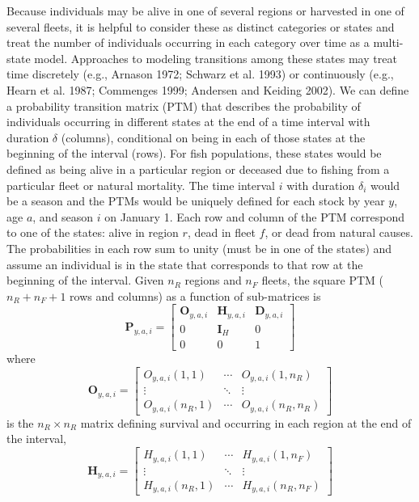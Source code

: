 \documentclass[
]{article}
\begin{document}
Because individuals may be alive in one of several regions or harvested in one of several fleets, it is helpful to consider these as distinct categories or states and treat the number of individuals occurring in each category over time as a multi-state model. Approaches to modeling transitions among these states may treat time discretely (e.g., Arnason 1972; Schwarz et al. 1993) or continuously (e.g., Hearn et al. 1987; Commenges 1999; Andersen and Keiding 2002). We can define a probability transition matrix (PTM) that describes the probability of individuals occurring in different states at the end of a time interval with duration \(\delta\) (columns), conditional on being in each of those states at the beginning of the interval (rows). For fish populations, these states would be defined as being alive in a particular region or deceased due to fishing from a particular fleet or natural mortality. The time interval \(i\) with duration \(\delta_i\) would be a season and the PTMs would be uniquely defined for each stock by year \(y\), age \(a\), and season \(i\) on January 1. Each row and column of the PTM correspond to one of the states: alive in region \(r\), dead in fleet \(f\), or dead from natural causes. The probabilities in each row sum to unity (must be in one of the states) and assume an individual is in the state that corresponds to that row at the beginning of the interval. Given \(n_R\) regions and \(n_F\) fleets, the square PTM (\(n_R + n_F + 1\) rows and columns) as a function of sub-matrices is
\begin{equation}\label{eq:ptm}
  \mathbf{P}_{y,a,i} = \begin{bmatrix}
    \mathbf{O}_{y,a,i} & \mathbf{H}_{y,a,i} & \mathbf{D}_{y,a,i} \\
    0 & \mathbf{I}_{H} & 0\\
    0 & 0 & 1
  \end{bmatrix}
\end{equation}
where
\begin{equation*}
  \mathbf{O}_{y,a,i} = 
  \begin{bmatrix}
    O_{y,a,i}(1,1) & \cdots & O_{y,a,i}(1,n_R) \\
    \vdots & \ddots & \vdots \\
    O_{y,a,i}(n_R,1) & \cdots & O_{y,a,i}(n_R,n_R)
  \end{bmatrix}
\end{equation*}
is the \(n_R \times n_R\) matrix defining survival and occurring in each region at the end of the interval,
\begin{equation*} 
  \mathbf{H}_{y,a,i} = 
  \begin{bmatrix}
    H_{y,a,i}(1,1) & \cdots & H_{y,a,i}(1,n_F) \\
    \vdots & \ddots & \vdots \\
    H_{y,a,i}(n_R,1) & \cdots & H_{y,a,i}(n_R,n_F)
  \end{bmatrix}
\end{equation*}
\end{document}
